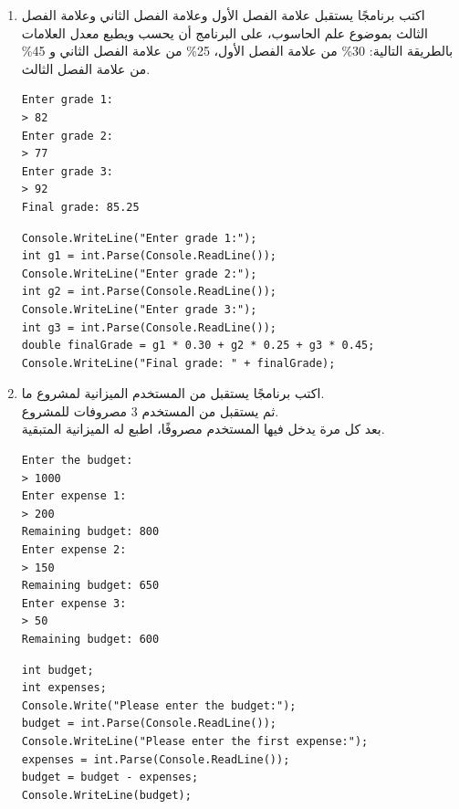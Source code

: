 \documentclass[14pt]{extarticle}
\begin{document}
\begin{enumerate}[itemsep=2cm]
\item
اكتب برنامجًا يستقبل علامة الفصل الأول وعلامة الفصل الثاني وعلامة الفصل الثالث بموضوع علم الحاسوب، على البرنامج أن يحسب ويطبع معدل العلامات بالطريقة التالية: 30\% من علامة الفصل الأول، 25\% من علامة الفصل الثاني و 45\% من علامة الفصل الثالث.
{\small
\ifdetailed
\begin{boxExample}
\begin{english}
\begin{verbatim}
Enter grade 1:
> 82
Enter grade 2:
> 77
Enter grade 3:
> 92
Final grade: 85.25
\end{verbatim}
\end{english}
\end{boxExample}
\fi
\ifwithsols
\begin{boxSolution}
\begin{english}
\begin{verbatim}
Console.WriteLine("Enter grade 1:");
int g1 = int.Parse(Console.ReadLine());
Console.WriteLine("Enter grade 2:");
int g2 = int.Parse(Console.ReadLine());
Console.WriteLine("Enter grade 3:");
int g3 = int.Parse(Console.ReadLine());
double finalGrade = g1 * 0.30 + g2 * 0.25 + g3 * 0.45;
Console.WriteLine("Final grade: " + finalGrade);
\end{verbatim}
\end{english}
\end{boxSolution}
\clearpage
\fi
}


\item
اكتب برنامجًا يستقبل من المستخدم الميزانية لمشروع ما. \\
ثم يستقبل من المستخدم 3 مصروفات للمشروع. \\
بعد كل مرة يدخل فيها المستخدم مصروفًا، اطبع له الميزانية المتبقية.
{\small
\ifdetailed
\begin{boxExample}
\begin{english}
\begin{verbatim}
Enter the budget:
> 1000
Enter expense 1:
> 200
Remaining budget: 800
Enter expense 2:
> 150
Remaining budget: 650
Enter expense 3:
> 50
Remaining budget: 600
\end{verbatim}
\end{english}
\end{boxExample}

\ifwithsols
\begin{boxSolution}
\begin{english}
\begin{verbatim}
int budget;
int expenses;
Console.Write("Please enter the budget:");
budget = int.Parse(Console.ReadLine());
Console.WriteLine("Please enter the first expense:");
expenses = int.Parse(Console.ReadLine());
budget = budget - expenses;
Console.WriteLine(budget);


\end{verbatim}
\end{english}
\end{boxSolution}}
\end{enumerate}
\end{document}
